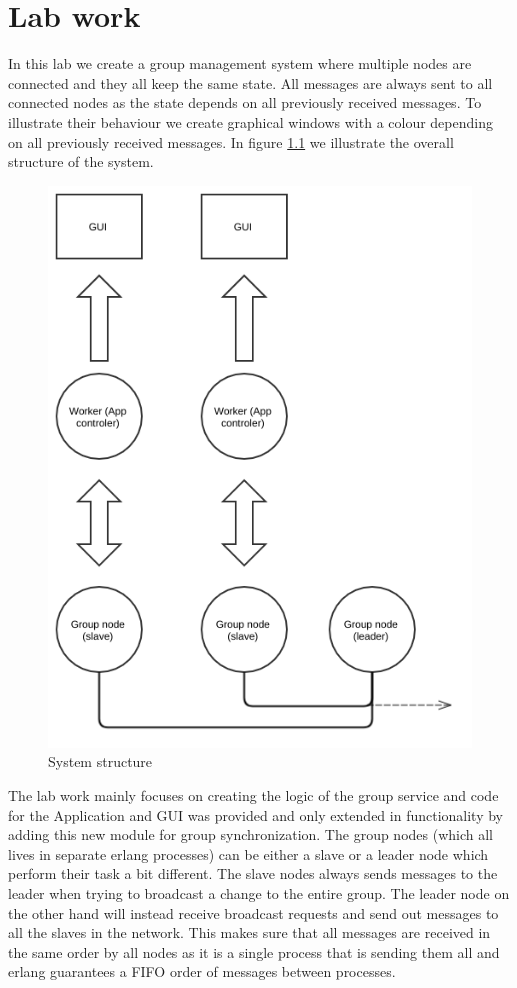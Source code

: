 \chapter{Lab work} 
\label{chap_Intro}

In this lab we create a group management system where multiple nodes are connected and they all keep the same state. All messages are always sent to all connected nodes as the state depends on all previously received messages. To illustrate their behaviour we create graphical windows with a colour depending on all previously received messages. In figure \ref{fig:diagram} we illustrate the overall structure of the system.

\begin{figure}[h]
\centering
\includegraphics[width=0.5\linewidth]{res/diagram}
\caption{System structure}
\label{fig:diagram}
\end{figure}

The lab work mainly focuses on creating the logic of the group service and code for the Application and GUI was provided and only extended in functionality by adding this new module for group synchronization. The group nodes (which all lives in separate erlang processes) can be either a slave or a leader node which perform their task a bit different. The slave nodes always sends messages to the leader when trying to broadcast a change to the entire group. The leader node on the other hand will instead receive broadcast requests and send out messages to all the slaves in the network. This makes sure that all messages are received in the same order by all nodes as it is a single process that is sending them all and erlang guarantees a FIFO order of messages between processes.

